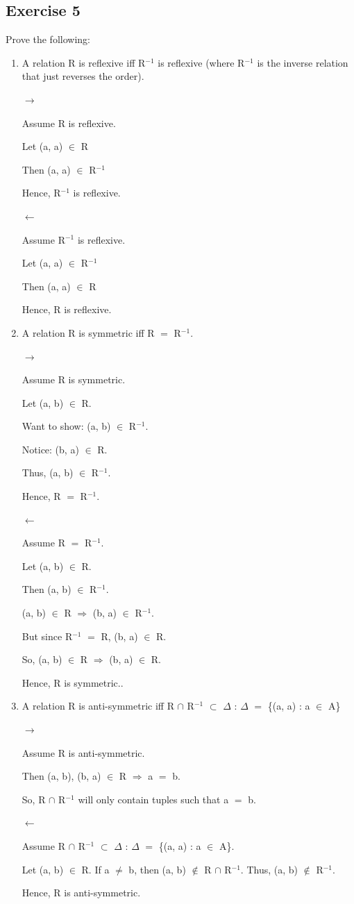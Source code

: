 \documentclass{article}
\newcommand{\mt}[1]{\ensuremath{#1}}
\newcommand\ssc[2][\DefaultOpt]{%
  \def\DefaultOpt{#2}%
  \subsection[#1]{#2}%
}
\newcommand{\balist}{\begin{enumerate}[label=\alph*.]}
\newcommand{\elist}{\end{enumerate}}
\newcommand{\mem}{\mt{\in} }
\newcommand{\sbs}{\mt{\subset} }         %
\newcommand{\lra}{ \mt{\longrightarrow} } %
\newcommand{\rar}{ \mt{\Rightarrow} }     %
\newcommand{\lla}{ \mt{\longleftarrow} }  %
\newcommand{\bk}[1]{\{#1\}}
\newcommand{\eql}{\mt{=} }
\newcommand{\uf}[2]{#1\mt{^{#2}}}
\newcommand{\inn}{\mt{\cap} }
\begin{document}
\ssc{Exercise 5}{
Prove the following:

\balist
\item A relation R is reflexive iff \uf{R}{-1} is reflexive (where \uf{R}{-1} is the inverse relation that just reverses the order).

\lra 

Assume R is reflexive.

Let (a, a) \mem R

Then (a, a) \mem \uf{R}{-1}

Hence, \uf{R}{-1} is reflexive.

\lla

Assume \uf{R}{-1} is reflexive.

Let (a, a) \mem \uf{R}{-1}

Then (a, a) \mem R

Hence, R is reflexive.


\item A relation R is symmetric iff R \eql \uf{R}{-1}.

\lra

Assume R is symmetric.

Let (a, b) \mem R.

Want to show: (a, b) \mem \uf{R}{-1}.

Notice: (b, a) \mem R.

Thus, (a, b) \mem \uf{R}{-1}.

Hence, R \eql \uf{R}{-1}.

\lla

Assume R \eql \uf{R}{-1}.

Let (a, b) \mem R.

Then (a, b) \mem \uf{R}{-1}.

(a, b) \mem R \rar (b, a) \mem \uf{R}{-1}.

But since \uf{R}{-1} \eql R, (b, a) \mem R.

So, (a, b) \mem R \rar (b, a) \mem R.

Hence, R is symmetric..

\item A relation R is anti-symmetric iff R \inn \uf{R}{-1} \sbs $\Delta$ : $\Delta$ \eql \bk{(a, a) : a \mem A}

\lra 

Assume R is anti-symmetric.

Then (a, b), (b, a) \mem R \rar a \eql b.

So, R \inn \uf{R}{-1} will only contain tuples such that a \eql b.

\lla 

Assume R \inn \uf{R}{-1} \sbs $\Delta$ : $\Delta$ \eql \bk{(a, a) : a \mem A}.

Let (a, b) \mem R. If a $\neq$ b, then (a, b) $\not\in$ R \inn \uf{R}{-1}. Thus, (a, b) $\not\in$ \uf{R}{-1}.

Hence, R is anti-symmetric.


\elist
}
\end{document}
